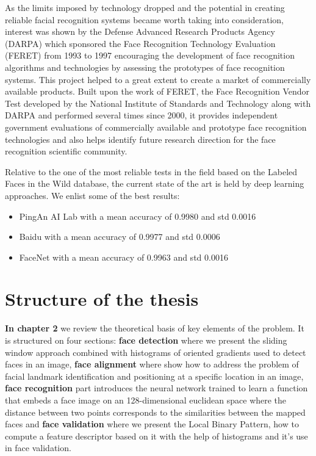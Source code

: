 As the limits imposed by technology dropped and the potential in creating reliable facial recognition systems became worth taking into consideration, interest was shown by the Defense Advanced Research Products Agency (DARPA) which sponsored the Face Recognition Technology Evaluation (FERET) \cite{PhillipsJMHRSRP00} from 1993 to 1997 encouraging the development of face recognition algorithms and technologies by assessing the prototypes of face recognition systems. This project helped to a great extent to create a market of commercially available products.
Built upon the work of FERET, the Face Recognition Vendor Test \cite{PhillipsGMBTB03} developed by the National Institute of Standards and Technology \cite{FaceNist} along with DARPA and performed several times since 2000, it provides independent government evaluations of commercially available and prototype face recognition technologies and also helps identify future research direction for the face recognition scientific community.

Relative to the one of the most reliable tests in the field based on the Labeled Faces in the Wild database, the current state of the art is held by deep learning approaches. We enlist some of the best results:
\begin{itemize}
	\item PingAn AI Lab with a mean accuracy of 0.9980 and std 0.0016
	\item Baidu with a mean accuracy of 0.9977 and std 0.0006
	\item FaceNet with a mean accuracy of 0.9963 and std 0.0016
\end{itemize}

\section{Structure of the thesis} 

\textbf{In chapter 2} we review the theoretical basis of key elements of the problem. It is structured on four sections: \textbf{face detection} where we present the sliding window approach combined with histograms of oriented gradients used to detect faces in an image, \textbf{face alignment} where show how to address the problem of facial landmark identification and positioning at a specific location in an image, \textbf{face recognition} part introduces the neural network trained to learn a function that embeds a face image on an 128-dimensional euclidean space where the distance between two points corresponds to the similarities between the mapped faces and \textbf{face validation} where we present the Local Binary Pattern, how to compute a feature descriptor based on it with the help of histograms and it's use in face validation.

